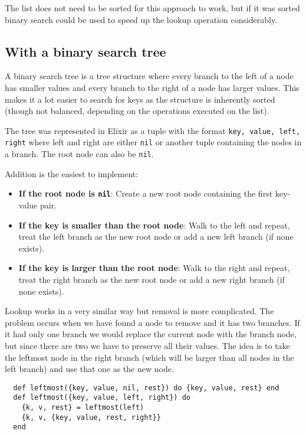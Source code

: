 \documentclass[a4paper,11pt]{article}
\begin{document}
The list does not need to be sorted for this approach to work, but if it was sorted binary search could be used to speed up the lookup operation considerably.

\subsection*{With a binary search tree}

A binary search tree is a tree structure where every branch to the left of a node has smaller values and every branch to the right of a node has larger values.
This makes it a lot easier to search for keys as the structure is inherently sorted (though not balanced, depending on the operations executed on the list).

The tree was represented in Elixir as a tuple with the format \texttt{{key, value, left, right}}
where left and right are either \texttt{nil} or another tuple containing the nodes in a branch. The root node can also be \texttt{nil}.

Addition is the easiest to implement:
\begin{itemize}
	\item \textbf{If the root node is \texttt{nil}}: Create a new root node containing the first key-value pair.
	\item \textbf{If the key is smaller than the root node}: Walk to the left and repeat, treat the left branch as the new root node or add a new left branch (if none exists).
	\item \textbf{If the key is larger than the root node}: Walk to the right and repeat, treat the right branch as the new root node or add a new right branch (if none exists).
\end{itemize}

Lookup works in a very similar way but removal is more complicated. The problem occurs when we have found a node to remove and it has two branches.
If it had only one branch we would replace the current node with the branch node, but since there are two we have to preserve all their values.
The idea is to take the leftmost node in the right branch (which will be larger than all nodes in the left branch) and use that one as the new node.

\begin{verbatim}
  def leftmost({key, value, nil, rest}) do {key, value, rest} end
  def leftmost({key, value, left, right}) do
    {k, v, rest} = leftmost(left)
    {k, v, {key, value, rest, right}}
  end
\end{verbatim}
\end{document}
